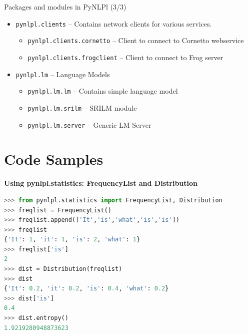 \documentclass[compress]{beamer}
\begin{document}
\begin{frame}
    \begin{block}{Packages and modules in PyNLPl (3/3)}
        \begin{itemize}
            \item \texttt{pynlpl.clients} -- Contains network clients for various services.
            \begin{itemize}
                \item \texttt{pynlpl.clients.cornetto} -- Client to connect to Cornetto webservice
                \item \texttt{pynlpl.clients.frogclient} -- Client to connect to Frog server
            \end{itemize}
            \item \texttt{pynlpl.lm} -- Language Models
            \begin{itemize}
                \item \texttt{pynlpl.lm.lm} -- Contains simple language model
                \item \texttt{pynlpl.lm.srilm} -- SRILM module
                \item \texttt{pynlpl.lm.server} -- Generic LM Server
            \end{itemize}
        \end{itemize}
    \end{block}

\end{frame}
    
\section{Code Samples}    
    
\begin{frame}[fragile]
\textbf{Using pynlpl.statistics: FrequencyList and Distribution}

\begin{lstlisting}[language=python]
>>> from pynlpl.statistics import FrequencyList, Distribution
>>> freqlist = FrequencyList()
>>> freqlist.append(['It','is','what','is','is'])
>>> freqlist
{'It': 1, 'it': 1, 'is': 2, 'what': 1}
>>> freqlist['is']
2
>>> dist = Distribution(freqlist)
>>> dist
{'It': 0.2, 'it': 0.2, 'is': 0.4, 'what': 0.2}
>>> dist['is']
0.4
>>> dist.entropy()
1.9219280948873623
\end{lstlisting}

\end{frame}
\end{document}
